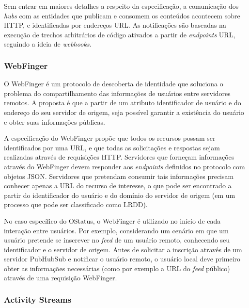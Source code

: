 Sem entrar em maiores detalhes a respeito da especificação, a comunicação dos
\textit{hubs} com as entidades que publicam e consomem os conteúdos acontecem sobre
HTTP, e identificadas por endereços URL. As notificações são baseadas na execução de
trechos arbitrários de código ativados a partir de \textit{endpoints} URL, seguindo a
ideia de \textit{webhooks}.

\subsubsection{WebFinger}


O WebFinger é um protocolo de descoberta de identidade que soluciona o problema do
compartilhamento das informações de usuários entre servidores remotos. A proposta é
que a partir de um atributo identificador de usuário e do endereço do seu servidor de
origem, seja possível garantir a existência do usuário e obter suas informações
públicas.

A especificação do WebFinger propõe que todos os recursos possam ser identificados
por uma URL, e que todas as solicitações e respostas sejam realizadas através de
requisições HTTP. Servidores que forneçam informações através do WebFinger devem
responder aos \textit{endpoints} definidos no protocolo com objetos JSON. Servidores
que pretendam consumir tais informações precisam conhecer apenas a URL do recurso de
interesse, o que pode ser encontrado a partir do identificador do usuário e do
domínio do servidor de origem (em um processo que pode ser classificado como LRDD). 


No caso específico do OStatus, o WebFinger é utilizado no início de cada interação
entre usuários. Por exemplo, considerando um cenário em que um usuário pretende se
inscrever no \textit{feed} de um usuário remoto, conhecendo seu identificador e o
servidor de origem. Antes de solicitar a inscrição através de um servidor PubHubSub e
notificar o usuário remoto, o usuário local deve primeiro obter as informações
necessárias (como por exemplo a URL do \textit{feed} público) através de uma
requisição  WebFinger.

\subsubsection{Activity Streams}

